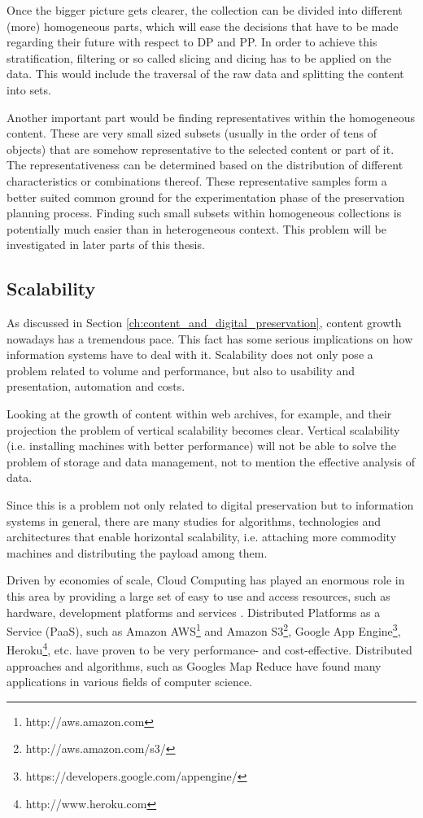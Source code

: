 Once the bigger picture gets clearer, the collection can be divided into different (more) homogeneous parts, which will ease the decisions that have to be made regarding their future with respect to DP and PP. In order to achieve this stratification, filtering or so called slicing and dicing has to be applied on the data. This would include the traversal of the raw data and splitting the content into sets.

Another important part would be finding representatives within the homogeneous content. These are very small sized subsets (usually in the order of tens of objects) that are somehow representative to the selected content or part of it. The representativeness can be determined based on the distribution of different characteristics or combinations thereof. These representative samples form a better suited common ground for the experimentation phase of the preservation planning process. Finding such small subsets within homogeneous collections is potentially much easier than in heterogeneous context. This problem will be investigated in later parts of this thesis.

\subsection{Scalability}
As discussed in Section \ref{ch:content_and_digital_preservation}, content growth nowadays has a tremendous pace. This fact has some serious implications on how information systems have to deal with it. Scalability does not only pose a problem related to volume and performance, but also to usability and presentation, automation and costs.

Looking at the growth of content within web archives, for example, and their projection the problem of vertical scalability becomes clear. Vertical scalability (i.e. installing machines with better performance) will not be able to solve the problem of storage and data management, not to mention the effective analysis of data.

Since this is a problem not only related to digital preservation but to information systems in general, there are many studies for algorithms, technologies and architectures that enable horizontal scalability, i.e. attaching more commodity machines and distributing the payload among them.

Driven by economies of scale, Cloud Computing has played an enormous role in this area by providing a large set of easy to use and access resources, such as hardware, development platforms and services \cite{Vaquero:2008, 4738445}. Distributed Platforms as a Service (PaaS), such as Amazon AWS\footnote{http://aws.amazon.com} and Amazon S3\footnote{http://aws.amazon.com/s3/}, Google App Engine\footnote{https://developers.google.com/appengine/}, Heroku\footnote{http://www.heroku.com}, etc. have proven to be very performance- and cost-effective. Distributed approaches and algorithms, such as Googles Map Reduce \cite{Dean:2008:MSD:1327452.1327492} have found many applications in various fields of computer science. 

